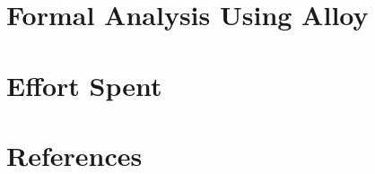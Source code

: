 \documentclass{article}
\begin{document}
	
	\section{Formal Analysis Using Alloy}
			
	
	\section{Effort Spent}
	
	
	
	\section{References}
	
	
\end{document}
